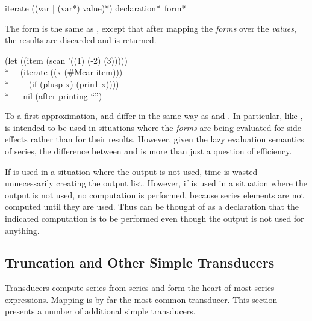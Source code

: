 \begin{defmac}
iterate ({({var | ({var}*)} value)}*) {declaration}* {\,form}*

The form  is the same as , except that after
mapping the {\it forms} over the {\it values}, the results are discarded and
 is returned.
\begin{lisp}
(let ((item (scan '((1) (-2) (3))))) \\*
~~(iterate ((x (\#Mcar item))) \\*
~~~~(if (plusp x) (prin1 x)))) \\*
~~{\EV} nil {\rm (after printing ``'')}
\end{lisp}

To a first approximation,  and  differ in the same
way as  and .  In particular, like ,
 is intended to be used in situations where the {\it forms} are
being evaluated for side effects rather than for their results.  However, given
the lazy evaluation semantics of series, the difference between
 and  is more than just a question of efficiency.

If  is used in a situation where the output is not used, time is
wasted unnecessarily creating the output list.  However, if  is
used in a situation where the output is not used, no computation is
performed, because series elements are not computed until they are used.
Thus  can be thought of as a declaration that the indicated
computation is to be performed even though the output is not used for
anything.
\end{defmac}

\subsection{Truncation and Other Simple Transducers}

Transducers compute series from series and form the heart of most series
expressions.  Mapping is by far the most common transducer.   This section
presents a number of additional simple transducers.


